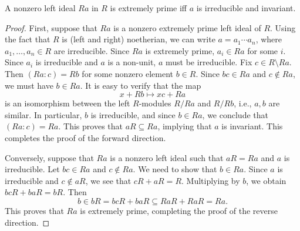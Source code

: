 \documentclass[10pt,a4paper]{amsart}
\begin{document}
	\begin{proposition}\label{prop: extremeply prime ideal of PID }
		A nonzero left ideal \( Ra \) in \( R \) is extremely prime iff \(a\) is irreducible and invariant.
	\end{proposition}

	\begin{proof}
		
		First, suppose that \(  Ra \) is a nonzero extremely prime left ideal of  \( R \). Using the fact that \(R\) is (left and right) noetherian, we can write \( a = a_1\cdots a_n\), where \(a_1,\dots,a_n\in R\) are irreducible. Since \(Ra\) is extremely prime, \(a_i\in Ra\) for some \(i\).  Since \(a_i\) is irreducible and \(a\) is a non-unit,  \( a \) must be irreducible. 
		Fix \(c\in R\setminus Ra\).  Then \((Ra : c) = Rb\) for some nonzero element \( b\in R\). Since \(bc\in Ra\) and \(c\notin Ra\), we must have \( b \in Ra \). It is easy to verify that the map 
		\[
		x+Rb\mapsto xc+Ra 
		\]
		is an isomorphism between
		the left \(R\)-modules \(R/Ra\) and \(R/Rb\), i.e., \(a,b\) are similar. In particular, \(b\) is irreducible, and since \(b\in Ra\), we conclude that \((Ra : c)=Ra\). This proves that  \(aR\subseteq Ra\), implying that \(a\) is invariant. This completes the proof of the forward direction.
		
		Conversely, suppose that \(Ra\) is a nonzero left ideal such that \(aR = Ra\) and  \(a\) is irreducible. Let \(bc\in Ra\) and \(c\notin Ra\). We need to show that \(b\in Ra\). Since \(a\) is irreducible and \(c\notin aR\), we see that \(cR+aR=R\). Multiplying by \(b\), we obtain \(bcR+baR=bR\). Then
		\[
			b\in bR = bcR+baR \subseteq RaR + RaR = Ra.
		\] 
		This proves that 
		\(Ra\) is extremely prime, completing the proof of the reverse direction. 
	\end{proof}
\end{document}
